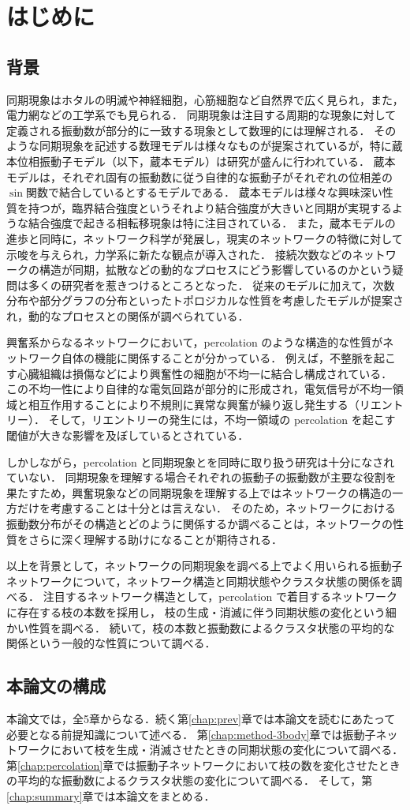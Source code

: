 \documentclass[../main]{subfiles}
\begin{document}
\chapter{はじめに}
\section{背景}
\label{chap:intro-back}
同期現象はホタルの明滅や神経細胞，心筋細胞など自然界で広く見られ，また，電力網などの工学系でも見られる．
同期現象は注目する周期的な現象に対して定義される振動数が部分的に一致する現象として数理的には理解される．
そのような同期現象を記述する数理モデルは様々なものが提案されているが，特に蔵本位相振動子モデル（以下，蔵本モデル）は研究が盛んに行われている．
蔵本モデルは，それぞれ固有の振動数に従う自律的な振動子がそれぞれの位相差の$\sin$関数で結合しているとするモデルである．
蔵本モデルは様々な興味深い性質を持つが，臨界結合強度というそれより結合強度が大きいと同期が実現するような結合強度で起きる相転移現象は特に注目されている．
また，蔵本モデルの進歩と同時に，ネットワーク科学が発展し，現実のネットワークの特徴に対して示唆を与えられ，力学系に新たな観点が導入された\cite{RODRIGUES20161}．
接続次数などのネットワークの構造が同期，拡散などの動的なプロセスにどう影響しているのかという疑問は多くの研究者を惹きつけるところとなった．
従来のモデルに加えて，次数分布や部分グラフの分布といったトポロジカルな性質を考慮したモデルが提案され，動的なプロセスとの関係が調べられている．

興奮系からなるネットワークにおいて，percolation のような構造的な性質がネットワーク自体の機能に関係することが分かっている\cite{PhysRevLett.110.158101,Pasquale2008SelforganizationAN}．
例えば，不整脈を起こす心臓組織は損傷などにより興奮性の細胞が不均一に結合し構成されている．
この不均一性により自律的な電気回路が部分的に形成され，電気信号が不均一領域と相互作用することにより不規則に異常な興奮が繰り返し発生する（リエントリー）．
そして，リエントリーの発生には，不均一領域の percolation を起こす閾値が大きな影響を及ぼしているとされている\cite{PhysRevLett.110.158101}．

しかしながら，percolation と同期現象とを同時に取り扱う研究は十分になされていない．
同期現象を理解する場合それぞれの振動子の振動数が主要な役割を果たすため，興奮現象などの同期現象を理解する上ではネットワークの構造の一方だけを考慮することは十分とは言えない．
そのため，ネットワークにおける振動数分布がその構造とどのように関係するか調べることは，ネットワークの性質をさらに深く理解する助けになることが期待される．

以上を背景として，ネットワークの同期現象を調べる上でよく用いられる振動子ネットワークについて，ネットワーク構造と同期状態やクラスタ状態の関係を調べる．
注目するネットワーク構造として，percolation で着目するネットワークに存在する枝の本数を採用し，
枝の生成・消滅に伴う同期状態の変化という細かい性質を調べる．
続いて，枝の本数と振動数によるクラスタ状態の平均的な関係という一般的な性質について調べる．
\section{本論文の構成}
\label{chap:intro-config}
本論文では，全5章からなる．続く第\ref{chap:prev}章では本論文を読むにあたって必要となる前提知識について述べる．
第\ref{chap:method-3body}章では振動子ネットワークにおいて枝を生成・消滅させたときの同期状態の変化について調べる．
第\ref{chap:percolation}章では振動子ネットワークにおいて枝の数を変化させたときの平均的な振動数によるクラスタ状態の変化について調べる．
そして，第\ref{chap:summary}章では本論文をまとめる．
\end{document}
